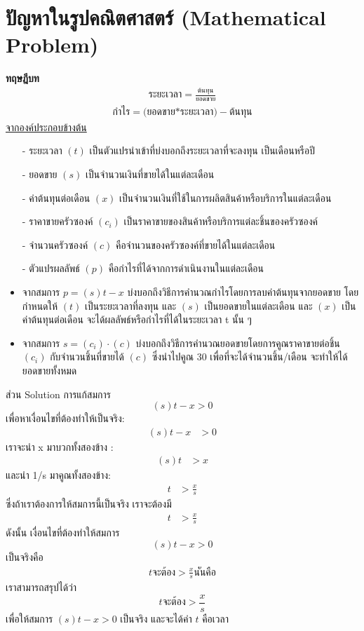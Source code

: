 \documentclass{report}
\begin{document}
\section{ปัญหาในรูปคณิตศาสตร์ (Mathematical Problem)}\par
\hspace{0.5cm}\textbf{ทฤษฎีบท}
\begin{align*}
\text{ระยะเวลา} = \frac{\text{ต้นทุน}}{\text{ยอดขาย}}
\end{align*}
\begin{align*}
\text{กำไร} = \text{(ยอดขาย*ระยะเวลา)} - \text{ต้นทุน}
\end{align*}
\hspace{0.5cm}\underline{จากองค์ประกอบข้างต้น}
\begin{itemize}
	\item[-] ระยะเวลา $(t)$ เป็นตัวแปรนำเข้าที่บ่งบอกถึงระยะเวลาที่จะลงทุน เป็นเดือนหรือปี
	\item[-] ยอดขาย $(s)$ เป็นจำนวนเงินที่ขายได้ในแต่ละเดือน
	\item[-] ค่าต้นทุนต่อเดือน $(x)$ เป็นจำนวนเงินที่ใช้ในการผลิตสินค้าหรือบริการในแต่ละเดือน
	\item[-] ราคาขายครัวซองค์ $(c_i)$ เป็นราคาขายของสินค้าหรือบริการแต่ละชิ้นของครัวซองค์
	\item[-] จำนวนครัวซองค์ $(c)$ คือจำนวนของครัวซองค์ที่ขายได้ในแต่ละเดือน
	\item[-] ตัวแปรผลลัพธ์ $(p)$ คือกำไรที่ได้จากการดำเนินงานในแต่ละเดือน
\end{itemize}
\begin{itemize}
\item จากสมการ $p = (s)t - x$ บ่งบอกถึงวิธีการคำนวณกำไรโดยการลบค่าต้นทุนจากยอดขาย โดยกำหนดให้ $(t)$ เป็นระยะเวลาที่ลงทุน และ $(s)$ เป็นยอดขายในแต่ละเดือน และ $(x)$ เป็นค่าต้นทุนต่อเดือน จะได้ผลลัพธ์หรือกำไรที่ได้ในระยะเวลา t นั้น ๆ \par
\item จากสมการ $s = (c_i)\cdot (c)$ บ่งบอกถึงวิธีการคำนวณยอดขายโดยการคูณราคาขายต่อชิ้น $(c_i)$ กับจำนวนชิ้นที่ขายได้ $(c)$ ซึ่งนำไปคูณ 30 เพื่อที่จะได้จำนวนชิ้น/เดือน จะทำให้ได้ยอดขายทั้งหมด
\end{itemize}
ส่วน Solution 
การแก้สมการ $$(s)t - x > 0$$ เพื่อหาเงื่อนไขที่ต้องทำให้เป็นจริง:
\begin{align*}	
	(s)t - x &> 0
\end{align*}
เราจะนำ x มาบวกทั้งสองข้าง :
\begin{align*}	
	(s)t &> x
\end{align*}
และนำ 1/s มาคูณทั้งสองข้าง:
\begin{align*}	
	t &> \frac{x}{s}
\end{align*}
ซึ่งถ้าเราต้องการให้สมการนี้เป็นจริง เราจะต้องมี 
\begin{align*}	
	t &> \frac{x}{s}
\end{align*}
ดังนั้น เงื่อนไขที่ต้องทำให้สมการ $$(s)t - x > 0$$ เป็นจริงคือ 
\begin{align*}	
t จะต้อง >\frac{x}{s} นั่นคือ
\end{align*}
เราสามารถสรุปได้ว่า 
$$t จะต้อง> \frac{x}{s} $$
เพื่อให้สมการ $(s)t - x > 0$ เป็นจริง และจะได้ค่า $t$ คือเวลา
\end{document}
